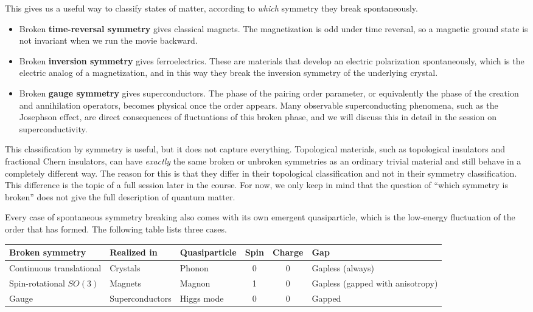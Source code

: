 

This gives us a useful way to classify states of matter, according to \emph{which} symmetry they
break spontaneously.

\begin{itemize}
\item Broken \textbf{time-reversal symmetry} gives classical magnets. The magnetization is odd under
  time reversal, so a magnetic ground state is not invariant when we run the movie backward.
\item Broken \textbf{inversion symmetry} gives ferroelectrics. These are materials that
  develop an electric polarization spontaneously, which is the electric analog of a magnetization,
  and in this way they break the inversion symmetry of the underlying crystal.
\item Broken \textbf{gauge symmetry} gives superconductors. The phase of the pairing order
  parameter, or equivalently the phase of the creation and annihilation operators, becomes physical
  once the order appears. Many observable superconducting phenomena, such as the Josephson effect,
  are direct consequences of fluctuations of this broken phase, and we will discuss this in detail in
  the session on superconductivity.
\end{itemize}

This classification by symmetry is useful, but it does not capture everything. Topological materials, such as topological insulators and fractional Chern
insulators, can have \emph{exactly} the same broken or unbroken symmetries as an ordinary trivial
material and still behave in a completely different way. The reason for this is that they differ in
their topological classification and not in their symmetry classification. This difference is the
topic of a full session later in the course. For now, we only keep in mind that the question of
``which symmetry is broken'' does not give the full description of quantum matter.

Every case of spontaneous symmetry breaking also comes with its own emergent quasiparticle, which is
the low-energy fluctuation of the order that has formed. The following table lists three cases.

\begin{center}
\begin{tabular}{|l|l|l|c|c|l|}
\hline
\textbf{Broken symmetry} & \textbf{Realized in} & \textbf{Quasiparticle} & \textbf{Spin} & \textbf{Charge} & \textbf{Gap} \\
\hline
Continuous translational & Crystals & Phonon & 0 & 0 & Gapless (always) \\
Spin-rotational $SO(3)$ & Magnets & Magnon & 1 & 0 & Gapless (gapped with anisotropy) \\
Gauge & Superconductors & Higgs mode & 0 & 0 & Gapped \\
\hline
\end{tabular}
\end{center}


